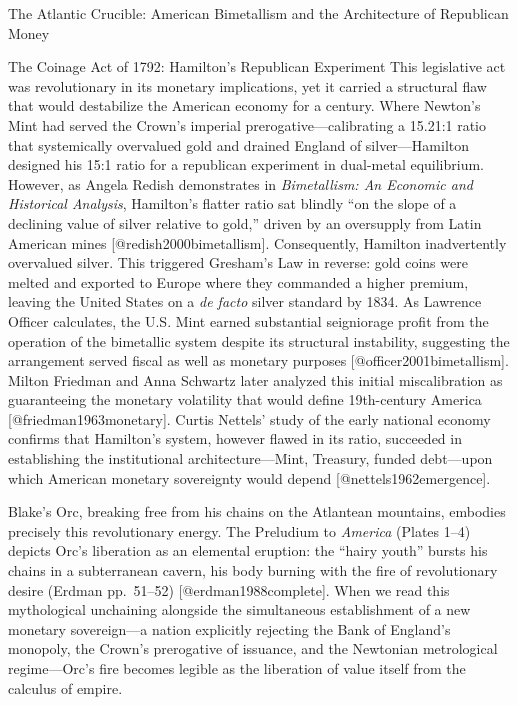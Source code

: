 \documentclass[
  ignorenonframetext,
]{beamer}
\begin{document}
\begin{frame}{The Atlantic Crucible: American Bimetallism and the
Architecture of Republican Money}
\begin{block}{The Coinage Act of 1792: Hamilton's Republican Experiment}
This legislative act was revolutionary in its monetary implications, yet
it carried a structural flaw that would destabilize the American economy
for a century. Where Newton's Mint had served the Crown's imperial
prerogative---calibrating a 15.21:1 ratio that systemically overvalued
gold and drained England of silver---Hamilton designed his 15:1 ratio
for a republican experiment in dual-metal equilibrium. However, as
Angela Redish demonstrates in \emph{Bimetallism: An Economic and
Historical Analysis}, Hamilton's flatter ratio sat blindly ``on the
slope of a declining value of silver relative to gold,'' driven by an
oversupply from Latin American mines {[}@redish2000bimetallism{]}.
Consequently, Hamilton inadvertently overvalued silver. This triggered
Gresham's Law in reverse: gold coins were melted and exported to Europe
where they commanded a higher premium, leaving the United States on a
\emph{de facto} silver standard by 1834. As Lawrence Officer calculates,
the U.S. Mint earned substantial seigniorage profit from the operation
of the bimetallic system despite its structural instability, suggesting
the arrangement served fiscal as well as monetary purposes
{[}@officer2001bimetallism{]}. Milton Friedman and Anna Schwartz later
analyzed this initial miscalibration as guaranteeing the monetary
volatility that would define 19th-century America
{[}@friedman1963monetary{]}. Curtis Nettels' study of the early national
economy confirms that Hamilton's system, however flawed in its ratio,
succeeded in establishing the institutional architecture---Mint,
Treasury, funded debt---upon which American monetary sovereignty would
depend {[}@nettels1962emergence{]}.

Blake's Orc, breaking free from his chains on the Atlantean mountains,
embodies precisely this revolutionary energy. The Preludium to
\emph{America} (Plates 1--4) depicts Orc's liberation as an elemental
eruption: the ``hairy youth'' bursts his chains in a subterranean
cavern, his body burning with the fire of revolutionary desire (Erdman
pp.~51--52) {[}@erdman1988complete{]}. When we read this mythological
unchaining alongside the simultaneous establishment of a new monetary
sovereign---a nation explicitly rejecting the Bank of England's
monopoly, the Crown's prerogative of issuance, and the Newtonian
metrological regime---Orc's fire becomes legible as the liberation of
value itself from the calculus of empire.
\end{block}


\end{frame}
\end{document}
